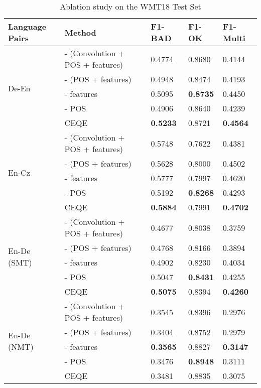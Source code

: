 \documentclass[11pt,a4paper]{article}
\begin{document}
\begin{table*}[htp]
\setlength\tabcolsep{3pt}
\centering
\begin{tabular}{lllll}
\hline
Language Pairs & Method & F1-BAD & F1-OK & F1-Multi \\ \hline
\multirow{5}[0]{*}{De-En} & - (Convolution + POS + features) & 0.4774 &  0.8680 &	0.4144 \\
& - (POS + features) & 0.4948 & 0.8474 & 0.4193 \\
& - features & 0.5095 & \bf{0.8735} & 0.4450 \\
& - POS & 0.4906 & 0.8640 & 0.4239  \\ 
& CEQE & \bf{0.5233} & 0.8721 & \bf{0.4564} \\ \hline
\multirow{5}[0]{*}{En-Cz} & - (Convolution + POS + features) & 0.5748 &	0.7622 &	0.4381 \\
& - (POS + features) & 0.5628 & 0.8000 & 0.4502 \\
& - features & 0.5777 & 0.7997 & 0.4620 \\
& - POS & 0.5192 & \bf{0.8268} & 0.4293 \\ 
& CEQE & \bf{0.5884} & 0.7991 & \bf{0.4702} \\ \hline
\multirow{5}[0]{*}{En-De (SMT)} & - (Convolution + POS + features) & 0.4677 &	0.8038 &	0.3759 \\
& - (POS + features) & 0.4768 & 0.8166 & 0.3894 \\
& - features & 0.4902 & 0.8230 & 0.4034 \\
& - POS & 0.5047 & \bf{0.8431} & 0.4255 \\
& CEQE & \bf{0.5075} & 0.8394 & \bf{0.4260} \\ \hline
\multirow{5}[0]{*}{En-De (NMT)} & - (Convolution + POS + features) & 0.3545 & 0.8396 &	0.2976 \\
& - (POS + features) & 0.3404 & 0.8752 & 0.2979 \\  
& - features & \bf{0.3565} & 0.8827 & \bf{0.3147} \\
& - POS & 0.3476 & \bf{0.8948} & 0.3111 \\ 
& CEQE & 0.3481 & 0.8835 & 0.3075 \\ \hline
\end{tabular}
\caption{Ablation study on the WMT18 Test Set \label{tab:ablation}}
\end{table*}

\end{document}
